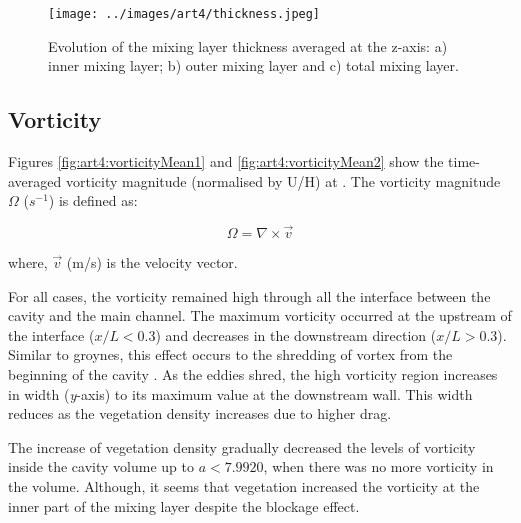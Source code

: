 \begin{figure}[!ht]
\centering
\texttt{[image: ../images/art4/thickness.jpeg]}
\caption{Evolution of the mixing layer thickness averaged at the z-axis: a) inner mixing layer; b) outer mixing layer and c) total mixing layer.}
\label{fig:art4:thickness}
\end{figure}

\subsection{Vorticity}
Figures \ref{fig:art4:vorticityMean1} and \ref{fig:art4:vorticityMean2} show the time-averaged vorticity magnitude (normalised by U/H) at . The vorticity magnitude $\Omega$ ($s^{-1}$) is defined as:

\begin{equation}
\Omega = \nabla \times \vec{v}
\label{eqn:art4:vorticity}
\end{equation}

where, $\vec{v}$ (m/s) is the velocity vector.

For all cases, the vorticity remained high through all the interface between the cavity and the main channel. The maximum vorticity occurred at the upstream of the interface ($x/L<0.3$) and decreases in the downstream direction ($x/L>0.3$). Similar to groynes, this effect occurs to the shredding of vortex from the beginning of the cavity \textcite{xiang2020}. As the eddies shred, the high vorticity region increases in width (\textit{y}-axis) to its maximum value at the downstream wall. This width reduces as the vegetation density increases due to higher drag.

The increase of vegetation density gradually decreased the levels of vorticity inside the cavity volume up to $a<7.9920$, when there was no more vorticity in the volume. Although, it seems that vegetation increased the vorticity at the inner part of the mixing layer despite the blockage effect.

